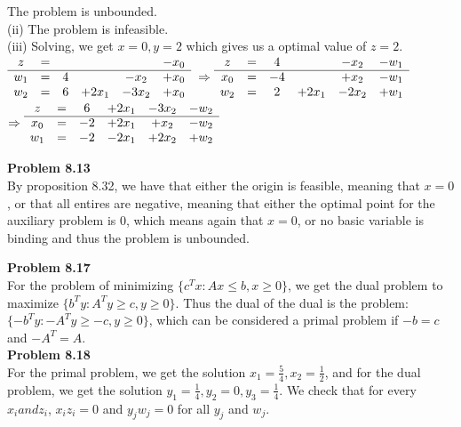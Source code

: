 \documentclass[letterpaper,12pt]{article}
\theoremstyle{definition}
\begin{document}
The problem is unbounded.\\

(ii) The problem is infeasible.\\

(iii) Solving, we get $ x = 0, y=2$ which gives us a optimal value of $z=2$.\\

$
\begin{array}{c c c c c c}
z & =&  & &  & -x_0\\
\cline{1-6}
w_1 & =&4 & & -x_2 & +x_0\\
w_2 & =&6 & +2x_1& -3x_2 &+x_0\\
\end{array}
$
\vspace{0.2in}
$
\Rightarrow
\begin{array}{c c c c c c}
z & =&  4& & -x_2 & -w_1\\
\cline{1-6}
x_0 & =&-4 & & +x_2 & -w_1\\
w_2 & =&2 & +2x_1& -2x_2 &+w_1\\
\end{array}
$
\\
\vspace{0.2in}
$
\Rightarrow
\begin{array}{c c c c c c}
z & =&  6& +2x_1& -3x_2 & -w_2\\
\cline{1-6}
x_0 & =&-2 & +2x_1& +x_2 & -w_2\\
w_1 & =&-2 & -2x_1& +2x_2 &+w_2\\
\end{array}
$

\noindent\textbf{Problem 8.13}\\

By proposition 8.32, we have that either the origin is feasible, meaning that $x=0$, or that all entires are negative, meaning that either the optimal point for the auxiliary problem is 0, which means again that $x=0$, or no basic variable is binding and thus the problem is unbounded. 

\noindent\textbf{Problem 8.17}\\

For the problem of minimizing $\{ c^Tx: Ax \leq b, x\geq 0 \}$, we get the dual problem to maximize $\{ b^Ty: A^Ty \geq c, y\geq 0 \}$. Thus the dual of the dual is the problem: $\{ -b^Ty: -A^Ty \geq -c, y\geq 0 \}$, which can be considered a primal problem if $-b  = c$ and $-A^T = A$.\\

\noindent\textbf{Problem 8.18}\\

For the primal problem, we get the solution $x_1 = \frac{5}{4}, x_2 = \frac{1}{2}$, and for the dual problem, we get the solution $y_1 = \frac{1}{4}, y_2 = 0, y_3 = \frac{1}{4}$. We check that for every $x_i and z_i$, $x_iz_i = 0$ and $y_jw_j = 0$ for all $y_j$ and $w_j$.
\end{document}
